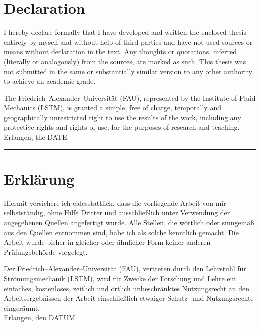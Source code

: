 \documentclass[
 	11pt,                 				%
  	notitlepage,          				%
  	twoside, 			   				%
 	bibliography=totoc,
  	listof=totoc,
  	headsepline,         				%
  	footsepline,         				%
  cleardoublepage=empty,				%
  numbers=noenddot,
]{scrreprt}
\begin{document}
	\fi	

\thispagestyle{empty}
\cleardoublepage

\ifenglish
\chapter*{Declaration}

I hereby declare formally that I have developed and written the enclosed thesis entirely by myself and without help of third parties and have not used sources or means without declaration in the text. Any thoughts or quotations, inferred (literally or analogously) from the sources, are marked as such. This thesis was not submitted in the same or substantially similar version to any other authority to achieve an academic grade.

The Friedrich--Alexander--Universität (FAU), represented by the Institute of Fluid Mechanics (LSTM), is granted a simple, free of charge, temporally and geographically unrestricted right to use the results of the work, including any protective rights and rights of use, for the purposes of research and teaching.
\\ [35mm]
Erlangen, the DATE \hspace{4cm} \rule{5cm}{0.02mm}
\else
\chapter*{Erklärung}

Hiermit versichere ich eidesstattlich, dass die vorliegende Arbeit von mir selbstständig, ohne Hilfe Dritter und ausschließlich unter Verwendung der angegebenen Quellen angefertigt wurde. Alle Stellen, die wörtlich oder sinngemäß aus den Quellen entnommen sind, habe ich als solche kenntlich gemacht. Die Arbeit wurde bisher in gleicher oder ähnlicher Form keiner anderen Prüfungsbehörde vorgelegt.

Der Friedrich--Alexander--Universität (FAU), vertreten durch den Lehrstuhl für Strömungsmechanik (LSTM), wird für Zwecke der Forschung und Lehre ein einfaches, kostenloses, zeitlich und örtlich unbeschränktes Nutzungsrecht an den Arbeitsergebnissen der Arbeit einschließlich etwaiger Schutz- und Nutzungsrechte eingeräumt.
\\ [35mm]
Erlangen, den DATUM \hspace{4cm} \rule{5cm}{0.02mm}
\fi	


\thispagestyle{empty}
\end{document}
